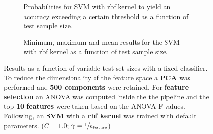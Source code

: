 \begin{figure}
    \captionsetup[subfigure]{justification=justified,singlelinecheck=false}
    \begin{subfigure}[t]{0.61\textwidth}
        
        \caption{Probabilities for SVM with rbf kernel to yield an accuracy exceeding a certain threshold as a function of test sample size.}
    \end{subfigure}
    \hspace{3.0mm}
    \begin{subfigure}[t]{0.34\textwidth}
        
        \caption{Minimum, maximum and mean results for the SVM with rbf kernel as a function of test sample size.}
    \end{subfigure}
    \caption[Effects of varying test sample size. SVM (kernel = rbf); Preprocessing: PCA ($n_\text{components} = \num{500}$); ANOVA feature selection ($k_\text{best} = \num{10}$)]{Results as a function of variable test set sizes with a fixed classifier. To reduce the dimensionality of the feature space a \textbf{PCA} was performed and \textbf{\num{500} components} were retained. For \textbf{feature selection} an ANOVA was computed inside the the pipeline and the top \textbf{\num{10} features} were taken based on the ANOVA F-values. Following, an \textbf{{SVM}} with a \textbf{{rbf kernel}} was trained with default parameters. ($C=\num{1.0}$; $\gamma=\sfrac{1}{n_\text{feature}}$)}
    \label{fig:PCA_500_components_10_best_selected_SVC}
\end{figure}

